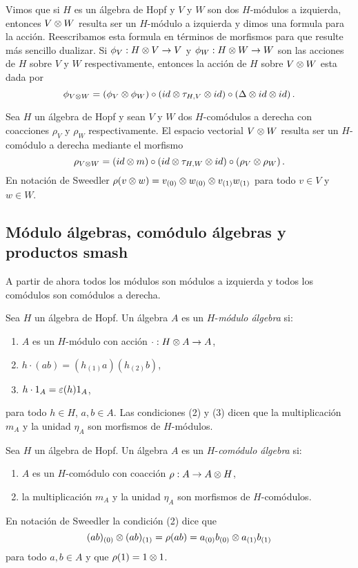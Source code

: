 \documentclass[a4paper,oneside,fleqn,11pt,../tesis.tex]{subfiles}
\begin{document}
Vimos que si $H$ es un álgebra de Hopf y $V$ y $W$ son dos $H$-módulos a izquierda, entonces $V\otimes W$ resulta ser un $H$-módulo a izquierda y dimos
una formula para la acción. Reescribamos esta formula en términos de morfismos para que resulte más sencillo dualizar. Si $\phi_{V}: H \otimes V \to V$ y 
$\phi_W: H \otimes W \to W$ son las acciones de $H$ sobre $V$ y $W$ respectivamente, entonces la acción de $H$ sobre $V \otimes W$ esta dada por
\[
	\phi_{V \otimes W} = \left(\phi_V \otimes \phi_W \right) \circ \left(id \otimes \tau_{H, V} \otimes id \right) \circ \left(\Delta \otimes id \otimes id \right).
\]

Sea $H$ un álgebra de Hopf y sean $V$ y $W$ dos $H$-comódulos a derecha con coacciones $\rho_V$ y $\rho_W$ respectivamente. El espacio vectorial $V \otimes W$
resulta ser un $H$-comódulo a derecha mediante el morfismo
\[
	\rho_{V\otimes W} = \left(id \otimes m\right) \circ \left(id \otimes \tau_{H, W} \otimes id\right) \circ \left(\rho_V \otimes \rho_W \right).
\]
En notación de Sweedler $\rho(v\otimes w) = v_{(0)} \otimes w_{(0)} \otimes v_{(1)} w_{(1)}$ para todo $v \in V$ y $w \in W$.

\subsection{Módulo álgebras, comódulo álgebras y productos smash}

A partir de ahora todos los módulos son módulos a izquierda y todos los comódulos son comódulos a derecha.

\begin{definition}
	Sea $H$ un álgebra de Hopf. Un álgebra $A$ es un $H$-\emph{módulo álgebra} si:
	\begin{enumerate}[(1)]
		\item $A$ es un $H$-módulo con acción $\cdot: H \otimes A \to A$,
		\item $h \cdot (ab) = (h_{(1)}a)(h_{(2)}b)$,
		\item $h \cdot 1_A = \varepsilon(h)1_A$,
	\end{enumerate}
	para todo $h \in H$, $a, b \in A$.
	Las condiciones (2) y (3) dicen que la multiplicación $m_A$ y la unidad $\eta_A$ son morfismos de $H$-módulos.
\end{definition}

\begin{definition}
	Sea $H$ un álgebra de Hopf. Un álgebra $A$ es un $H$-\emph{comódulo álgebra} si:
	\begin{enumerate}
		\item $A$ es un $H$-comódulo con coacción $\rho: A \to A\otimes H$,
		\item la multiplicación $m_A$ y la unidad $\eta_A$ son morfismos de $H$-comódulos.
	\end{enumerate}
	En notación de Sweedler la condición (2) dice que
	\[
		(ab)_{(0)}\otimes (ab)_{(1)} = \rho(ab) = a_{(0)}b_{(0)} \otimes a_{(1)}b_{(1)}
	\] para todo $a, b \in A$ y que $\rho(1) = 1\otimes 1$.
\end{definition}
\end{document}
